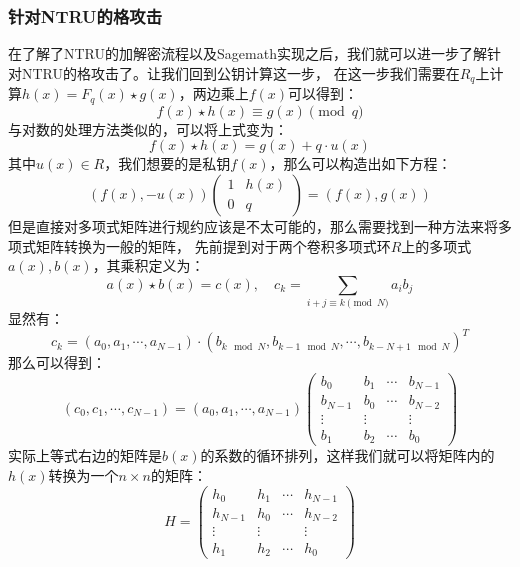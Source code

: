 \documentclass{book}
\numberwithin{equation}{subsubsection}
\begin{document}
\subsubsection{针对NTRU的格攻击}
在了解了NTRU的加解密流程以及Sagemath实现之后，我们就可以进一步了解针对NTRU的格攻击了。让我们回到公钥计算这一步，
在这一步我们需要在$R_q$上计算$h(x)=F_q(x)\star g(x)$，两边乘上$f(x)$可以得到：
\begin{equation}
    f(x)\star h(x)\equiv g(x)\pmod{q}
    \nonumber
\end{equation}
与对数的处理方法类似的，可以将上式变为：
\begin{equation}
    f(x)\star h(x)=g(x)+q\cdot u(x)
    \nonumber
\end{equation}
其中$u(x)\in R$，我们想要的是私钥$f(x)$，那么可以构造出如下方程：
\begin{equation}
    (f(x),-u(x))
    \left(\begin{matrix}
        1&h(x)\\
        0&q
    \end{matrix}\right)=
    (f(x),g(x))
\end{equation}
但是直接对多项式矩阵进行规约应该是不太可能的，那么需要找到一种方法来将多项式矩阵转换为一般的矩阵，
先前提到对于两个卷积多项式环$R$上的多项式$a(x),b(x)$，其乘积定义为：
\begin{equation}
    a(x)\star b(x)=c(x),\quad c_k=\sum_{i+j\equiv k\pmod{N}}{a_{i}b_{j}}
    \nonumber
\end{equation}
显然有：
\begin{equation}
    c_k=(a_0,a_1,\cdots,a_{N-1})\cdot(b_{k\mod{N}},b_{k-1\mod{N}},\cdots,b_{k-N+1\mod{N}})^T
    \nonumber
\end{equation}
那么可以得到：
\begin{equation}
    (c_0,c_1,\cdots, c_{N-1})=(a_0,a_1,\cdots,a_{N-1})
    \left(\begin{matrix}
        b_0&b_1&\cdots&b_{N-1}\\
        b_{N-1}&b_0&\cdots&b_{N-2}\\
        \vdots&\vdots&&\vdots\\
        b_{1}&b_{2}&\cdots&b_{0}
    \end{matrix}\right)
    \nonumber
\end{equation}
实际上等式右边的矩阵是$b(x)$的系数的循环排列，这样我们就可以将矩阵内的$h(x)$转换为一个$n\times n$的矩阵：
\begin{equation}
    H=\left(\begin{matrix}
        h_0&h_1&\cdots&h_{N-1}\\
        h_{N-1}&h_0&\cdots&h_{N-2}\\
        \vdots&\vdots&&\vdots\\
        h_{1}&h_{2}&\cdots&h_{0}
    \end{matrix}\right)
    \nonumber
\end{equation}
\end{document}

